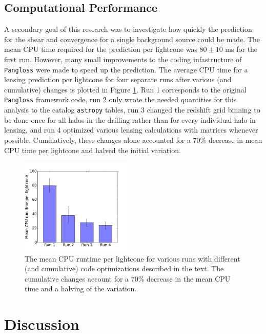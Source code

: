 \documentclass[%
 reprint,
 amsmath,amssymb,
 aps,nofootinbib
]{revtex4-1}
\begin{document}
\subsection*{Computational Performance}

A secondary goal of this research was to investigate how quickly the prediction for the shear and convergence for a single background source could be made. The mean CPU time required for the prediction per lightcone was ${80\pm10}$ ms for the first run. However, many small improvements to the coding infastructure of \texttt{Pangloss} were made to speed up the prediction. The average CPU time for a lensing prediction per lightcone for four separate runs after various (and cumulative) changes is plotted in Figure \ref{cpu_plot}. Run 1 corresponds to the original \texttt{Pangloss} framework code, run 2 only wrote the needed quantities for this analysis to the catalog \texttt{astropy} tables, run 3 changed the redshift grid binning to be done once for all halos in the drilling rather than for every individual halo in lensing, and run 4 optimized various lensing calculations with matrices whenever possible. Cumulatively, these changes alone accounted for a 70\% decrease in mean CPU time per lightcone and halved the initial variation.

\begin{figure}
    \centering
    \includegraphics[width=0.475\textwidth]{figs-swe/profile_bar.png}
    \captionsetup{justification=raggedright,singlelinecheck=false}
    \caption{The mean CPU runtime per lightcone for various runs with different (and cumulative) code optimizations described in the text. The cumulative changes account for a 70\% decrease in the mean CPU time and a halving of the variation.}
    \label{cpu_plot}
\end{figure}

\section{Discussion}
\end{document}
